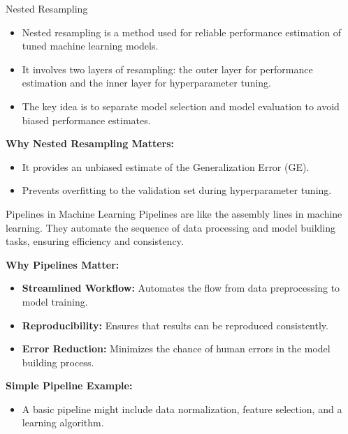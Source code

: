 \documentclass[11pt,compress,t,notes=noshow, xcolor=table]{beamer}
\begin{document}
\begin{vbframe}{Nested Resampling}

\begin{itemize}
\item \small Nested resampling is a method used for reliable performance estimation of tuned machine learning models.
\item \small It involves two layers of resampling: the outer layer for performance estimation and the inner layer for hyperparameter tuning.
\item \small The key idea is to separate model selection and model evaluation to avoid biased performance estimates.
\end{itemize}

\textbf{Why Nested Resampling Matters:}
\begin{itemize}
\item \small It provides an unbiased estimate of the Generalization Error (GE).
\item \small Prevents overfitting to the validation set during hyperparameter tuning.
\end{itemize}

\end{vbframe}

\begin{vbframe}{Pipelines in Machine Learning}
Pipelines are like the assembly lines in machine learning. They automate the sequence of data processing and model building tasks, ensuring efficiency and consistency.

\textbf{Why Pipelines Matter:}
\begin{itemize}
\item \small \textbf{Streamlined Workflow:} Automates the flow from data preprocessing to model training.
\item \small \textbf{Reproducibility:} Ensures that results can be reproduced consistently.
\item \small \textbf{Error Reduction:} Minimizes the chance of human errors in the model building process.
\end{itemize}

\textbf{Simple Pipeline Example:}
\begin{itemize}
\item A basic pipeline might include data normalization, feature selection, and a learning algorithm.
\end{itemize}
\end{vbframe}
\end{document}

